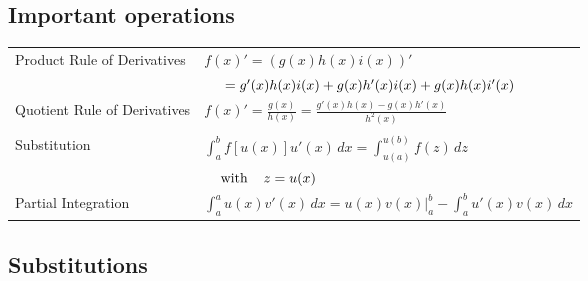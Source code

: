 \egroup


\subsection*{Important operations}
\bgroup
    \def\arraystretch{1.3}
    \begin{tabular}{ll}

        \multirow{2}{*}{Product Rule of Derivatives} &
        $f(x)' = (g(x)h(x)i(x))'$ \\* &
        $\hspace{5mm} = g'(x)h(x)i(x) + g(x)h'(x)i(x) + g(x)h(x)i'(x)$
        \\

        Quotient Rule of Derivatives &
        $f(x)' = \frac{g(x)}{h(x)} = \frac{g'(x)h(x) - g(x)h'(x)}{h^2(x)}$
        \\

        &\\

        \multirow{2}{*}{Substitution} &
        $\int_a^b f[u(x)]u'(x)\,dx = \int_{u(a)}^{u(b)} f(z)\,dz$ \\* &
        $\hspace{4mm}\textrm{with}\hspace{4mm} z = u(x)$
        \\

        Partial Integration &
        $\int_a^a u(x)v'(x)\,dx = u(x)v(x)\rvert_a^b - \int_a^b u'(x)v(x)\,dx$
        \\
    \end{tabular}
\egroup


\subsection*{Substitutions}

